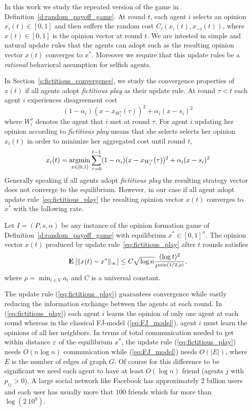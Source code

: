 In this work we study the repeated version of the game in Definition~\ref{d:random_payoff_game}. 
At round $t$, each agent $i$ selects an opinion $x_i(t) \in [0,1]$ and then suffers the
random cost $C_i(x_i(t),x_{-i}(t))$, where $x(t) \in [0,1]$ is the opinion vector at round $t$. 
We are intested in simple and natural update rules
that the agents can adopt such as the resulting opinion vector $x(t)$ converges to $x^*$.
Moreover we require that this update rules be a \emph{rational} behavioral assumption for
selfish agents.

In Section~\ref{s:fictitious_convergence}, we study the convergence properties of $x(t)$ if all agents adopt \emph{fictitious play}
as their update rule. At round $\tau < t$ each agent $i$ experiences disagreement cost
\[(1-\alpha_i)(x-x_{W_i^\tau}(\tau))^2+\alpha_i(x-s_i)^2 \]where $W_i^\tau$
denotes the agent that $i$ met at round $\tau$. For agent $i$ updating her opinion according to \emph{fictitious play}
means that she selects selects her opinion $x_i(t)$ in order to minimize her aggregated cost until round $t$,
\begin{equation}\label{eq:fictitious_play}
x_i(t) =\operatorname*{argmin}_{x \in [0,1]}\sum_{\tau=0}^{t-1}(1-\alpha_i)(x-x_{W_i^\tau}(\tau))^2+\alpha_i(x-s_i)^2
\end{equation}
\noindent Generally speaking if all agents adopt \emph{fictitious play} the resulting
strategy vector does not converge to the equilibrium. However, in our case if all agent adopt update rule~\ref{eq:fictitious_play}
the resulting opinion vector $x(t)$ converges to $x^*$ with the following
rate.
\begin{theorem}\label{t:fictitious_convergence}
  Let $I = (P,s, \alpha)$ be any instance of the opinion formation
  game of Definition~\ref{d:random_payoff_game} with equilibrium
  $x^* \in [0,1]^n$.  The opinion vector $x(t)$ produced by
  update rule~\ref{eq:fictitious_play} after $t$ rounds satisfies
  \[
    \bm{\mathrm{E}}_{} \left[ \| x(t) - x^* \|_{\infty} \right] \leq
    C \sqrt{\log n}\frac{(\log t)^{2}}{t^{\min(1/2,\rho)}},
  \]
  where $\rho = \min_{i \in V} a_i$ and $C$ is a universal constant.
\end{theorem}
The update rule (\ref{eq:fictitious_play}) guarantees convergence
while vastly reducing the information exchange between the agents
at each round. In (\ref{eq:fictitious_play}) each agent $i$ learns the opinion of only one agent
at each round whereas in the classical FJ-model (\ref{eq:FJ_model}), agent $i$ must
learn the opinions of all her neighbors. In terms of
total communication needed to get within distance $\varepsilon$ of the
equilibrium $x^*$, the update rule (\ref{eq:fictitious_play}) needs
$O(n \log n)$ communication while (\ref{eq:FJ_model}) needs
$O(|E|)$, where $E$ is the number of edges of graph $G$.
Of course for this difference to be significant we need
each agent to have at least $O(\log n)$ friend (agents $j$ with $p_{ij}>0$). A large social
network like Facebook has approximately $2$ billion users and each user
has usually more that $100$ friends which far more than $\log(2\ 10^9)$.

